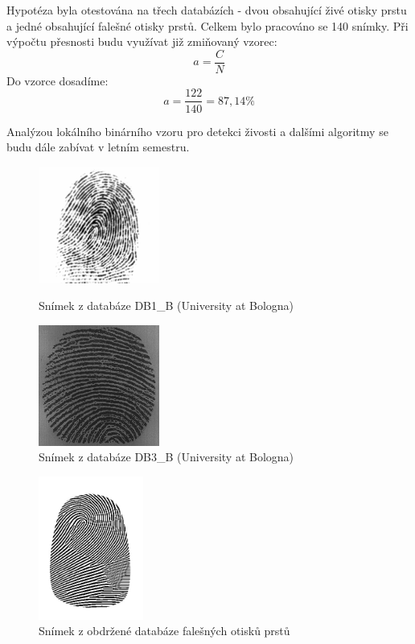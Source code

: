  Hypotéza byla otestována na třech databázích - dvou obsahující živé otisky prstu a jedné obsahující falešné otisky prstů. Celkem bylo pracováno se 140 snímky. Při výpočtu přesnosti budu využívat již zmiňovaný vzorec:\\
 $$a = \frac{C}{N}$$
 Do vzorce dosadíme:\\
  $$a = \frac{122}{140} = 87,14\%$$
 
 Analýzou lokálního binárního vzoru pro detekci živosti a  dalšími algoritmy se budu dále zabívat v letním semestru.
 
 \begin{figure}[htbp]
  \begin{minipage}[b]{0.5\linewidth}
    \centering
    \includegraphics[width=150px]{obrazky-figures/db3.png}
    \caption{Snímek z databáze DB1\_B (University at Bologna)}
  \end{minipage}
  \hspace{0.3cm}
  \begin{minipage}[b]{0.5\linewidth}
    \centering
    \includegraphics[width=150px]{obrazky-figures/db2.png}
    \caption{Snímek z databáze DB3\_B (University at Bologna)}
  \end{minipage}
\end{figure}
\begin{figure}[htbp]
    \centering
    \includegraphics[width=130px]{obrazky-figures/db1.png}
    \caption{Snímek z obdržené databáze falešných otisků prstů}
\end{figure}

